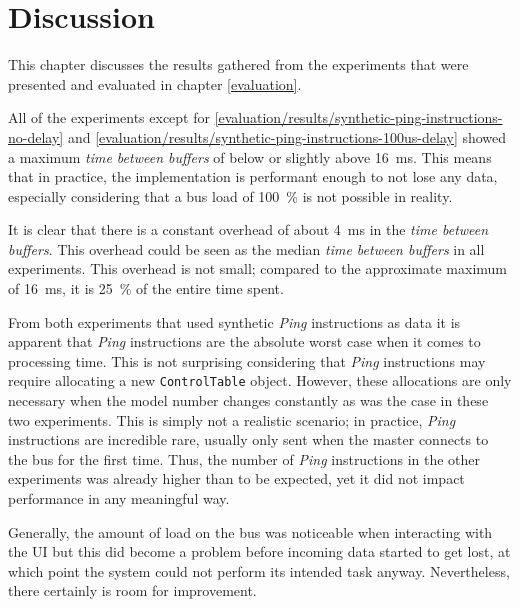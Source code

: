 \chapter{Discussion}
\label{discussion}

This chapter discusses the results gathered from the experiments that were presented and evaluated in
chapter \ref{evaluation}.
\bigbreak

All of the experiments except for \ref{evaluation/results/synthetic-ping-instructions-no-delay} and
\ref{evaluation/results/synthetic-ping-instructions-100us-delay} showed a maximum \textit{time between buffers}
of below or slightly above \SI{16}{\milli\second}. This means that in practice, the implementation is
performant enough to not lose any data, especially considering that a bus load of \SI{100}{\percent}
is not possible in reality.

It is clear that there is a constant overhead of about \SI{4}{\milli\second} in the
\textit{time between buffers}. This overhead could be seen as the median \textit{time between buffers}
in all experiments. This overhead is not small; compared to the approximate maximum of \SI{16}{\milli\second},
it is \SI{25}{\percent} of the entire time spent.

From both experiments that used synthetic \textit{Ping} instructions as data it is apparent that
\textit{Ping} instructions are the absolute worst case when it comes to processing time. This is
not surprising considering that \textit{Ping} instructions may require allocating a new
\lstinline{ControlTable} object. However, these allocations are only necessary when the model number
changes constantly as was the case in these two experiments. This is simply not a realistic scenario;
in practice, \textit{Ping} instructions are incredible rare, usually only sent when the master
connects to the bus for the first time. Thus, the number of \textit{Ping} instructions in the other
experiments was already higher than to be expected, yet it did not impact performance in any
meaningful way.

Generally, the amount of load on the bus was noticeable when interacting with the UI but this did
become a problem before incoming data started to get lost, at which point the system could not perform
its intended task anyway. Nevertheless, there certainly is room for improvement.
